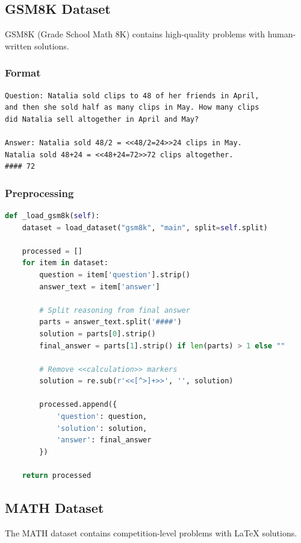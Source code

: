 \documentclass[11pt,a4paper]{article}
\begin{document}
\subsection{GSM8K Dataset}

GSM8K (Grade School Math 8K) contains high-quality problems with human-written solutions.

\subsubsection{Format}

\begin{verbatim}
Question: Natalia sold clips to 48 of her friends in April, 
and then she sold half as many clips in May. How many clips 
did Natalia sell altogether in April and May?

Answer: Natalia sold 48/2 = <<48/2=24>>24 clips in May.
Natalia sold 48+24 = <<48+24=72>>72 clips altogether.
#### 72
\end{verbatim}

\subsubsection{Preprocessing}

\begin{lstlisting}[language=Python]
def _load_gsm8k(self):
    dataset = load_dataset("gsm8k", "main", split=self.split)
    
    processed = []
    for item in dataset:
        question = item['question'].strip()
        answer_text = item['answer']
        
        # Split reasoning from final answer
        parts = answer_text.split('####')
        solution = parts[0].strip()
        final_answer = parts[1].strip() if len(parts) > 1 else ""
        
        # Remove <<calculation>> markers
        solution = re.sub(r'<<[^>]+>>', '', solution)
        
        processed.append({
            'question': question,
            'solution': solution,
            'answer': final_answer
        })
    
    return processed
\end{lstlisting}

\subsection{MATH Dataset}

The MATH dataset contains competition-level problems with LaTeX solutions.
\end{document}
